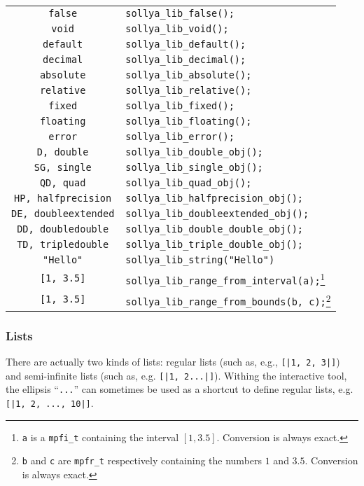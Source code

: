 \documentclass[a4paper]{article}
\begin{document}
\begin{table}[htp]
\begin{minipage}{\textwidth}
\begin{center}
\begin{tabular}{|c|l|}
\verb|false| & \verb|sollya_lib_false();| \\
\verb|void| & \verb|sollya_lib_void();| \\
\verb|default| & \verb|sollya_lib_default();| \\
\verb|decimal| & \verb|sollya_lib_decimal();| \\
\verb|absolute| & \verb|sollya_lib_absolute();| \\
\verb|relative| & \verb|sollya_lib_relative();| \\
\verb|fixed| & \verb|sollya_lib_fixed();| \\
\verb|floating| & \verb|sollya_lib_floating();| \\
\verb|error| & \verb|sollya_lib_error();| \\
\verb|D, double| & \verb|sollya_lib_double_obj();| \\
\verb|SG, single| & \verb|sollya_lib_single_obj();| \\
\verb|QD, quad| & \verb|sollya_lib_quad_obj();| \\
\verb|HP, halfprecision| & \verb|sollya_lib_halfprecision_obj();| \\
\verb|DE, doubleextended| & \verb|sollya_lib_doubleextended_obj();| \\
\verb|DD, doubledouble| & \verb|sollya_lib_double_double_obj();| \\
\verb|TD, tripledouble| & \verb|sollya_lib_triple_double_obj();| \\
\verb|"Hello"| &  \verb|sollya_lib_string("Hello")| \\
\verb|[1, 3.5]| &  \verb|sollya_lib_range_from_interval(a);|\footnote{\texttt{a} is a \texttt{mpfi\_t} containing the interval $[1, 3.5]$. Conversion is always exact.} \\
\verb|[1, 3.5]| &  \verb|sollya_lib_range_from_bounds(b, c);|\footnote[2]{\texttt{b} and \texttt{c} are \texttt{mpfr\_t} respectively containing the numbers $1$ and $3.5$.  Conversion is always exact.} \\ \hline
  \end{tabular}
\end{center}
\end{minipage}
\end{table}

\subsubsection{Lists}
\label{creating_lists}
There are actually two kinds of lists: regular lists (such as, e.g., \verb#[|1, 2, 3|]#) and semi-infinite lists (such as, e.g. \verb#[|1, 2...|]#). Withing the interactive tool, the ellipsis ``\texttt{...}'' can sometimes be used as a shortcut to define regular lists, e.g. \verb#[|1, 2, ..., 10|]#.
\end{document}
